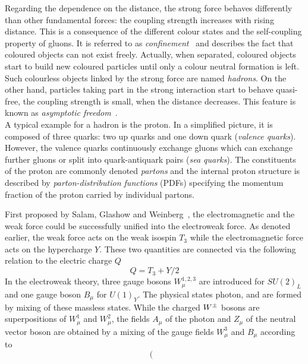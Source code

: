 \begin{description}
\begin{description}
Regarding the dependence on the distance, the strong force behaves differently than other fundamental forces: the coupling strength increases with rising distance. This is a consequence of the different colour states and the self-coupling property of gluons. It is referred to as \textit{confinement}~\cite{Alkofer:2006fu} and describes the fact that coloured objects can not exist freely. Actually, when separated, coloured objects start to build new coloured particles until only a colour neutral formation is left. Such colourless objects linked by the strong force are named \textit{hadrons}. On the other hand, particles taking part in the strong interaction start to behave quasi-free, \ie the coupling strength is small, when the distance decreases. This feature is known as \textit{asymptotic freedom}~\cite{PhysRevLett.30.1346, PhysRevLett.30.1343}. \\
A typical example for a hadron is the proton. In a simplified picture, it is composed of three quarks: two up quarks and one down quark (\textit{valence quarks}). However, the valence quarks continuously exchange gluons which can exchange further gluons or split into quark-antiquark pairs (\textit{sea quarks}). The constituents of the proton are commonly denoted \textit{partons} and the internal proton structure is described by \textit{parton-distribution functions} (PDFs) specifying the momentum fraction of the proton carried by individual partons.
 \end{description}
First proposed by Salam, Glashow and Weinberg~\cite{Glashow:1961tr, Weinberg:1967tq}, the electromagnetic and the weak force could be successfully unified into the electroweak force. As denoted earlier, the weak force acts on the weak isospin $T_{3}$ while the electromagnetic force acts on the hypercharge $Y$. These two quantities are connected via the following relation to the electric charge $Q$
\begin{equation*}
Q = T_{3} + Y/2
\end{equation*}
In the electroweak theory, three gauge bosons $W^{1,2,3}_{\mu}$ are introduced for $SU(2)_{L}$ and one gauge boson $B_{\mu}$ for $U(1)_{Y}$. The physical states photon, \Wpm and \Z are formed by mixing of these massless states. While the charged $W^{\pm}$ bosons are superpositions of $W^{1}_{\mu}$ and $W^{2}_{\mu}$, the fields $A_{\mu}$ of the photon and $Z_{\mu}$ of the neutral vector boson are obtained by a mixing of the gauge fields $W^{3}_{\mu}$ and $B_{\mu}$ according to
\begin{equation}
\left(
\begin{matrix}

\end{matrix}
\end{equation}
\end{description}
